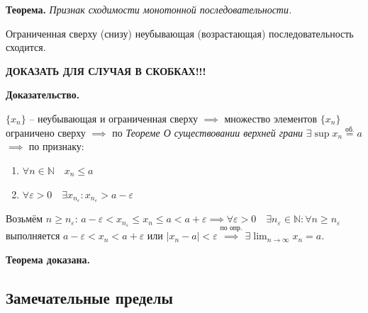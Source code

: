 \documentclass[a4paper,oneside]{article}
\newcommand{\bydef}{\stackrel{\text{по опр.}}{\implies}} %
\newcommand{\parspace}{\vspace{10pt}}
\newcommand{\dslim}{\displaystyle\lim}
\newcommand{\dslimn}{\dslim_{n \to \infty}}
\begin{document}
\parspace

\textbf{Теорема.} \textit{Признак сходимости монотонной последовательности.}

Ограниченная сверху (снизу) неубывающая (возрастающая) последовательность сходится.

\textbf{ДОКАЗАТЬ ДЛЯ СЛУЧАЯ В СКОБКАХ!!!}

\textbf{Доказательство.}

$\{x_n\}$ -- неубывающая и ограниченная сверху $\implies$ множество элементов
$\{x_n\}$ ограничено сверху $\implies$ по
\textit{Теореме О существовании верхней грани} 
$\exists \sup x_n \stackrel{\text{об.}}{=} a$ $\implies$ по признаку:
\begin{enumerate}
    \item $\forall n \in \mathbb{N} \quad x_n \le a$
    \item $\forall \varepsilon > 0 \quad 
    \exists x_{n_\varepsilon} : x_{n_\varepsilon} > a - \varepsilon$
\end{enumerate}

Возьмём $n \ge n_\varepsilon$: 
$a - \varepsilon < x_{n_\varepsilon} \le x_n \le a < a + \varepsilon
\implies \forall \varepsilon > 0 \quad \exists n_\varepsilon \in \mathbb{N}:
\forall n \ge n_\varepsilon$ выполняется $a - \varepsilon < x_n < a + \varepsilon$
или $|x_n - a| < \varepsilon \bydef \exists \dslimn x_n = a$.

\textbf{Теорема доказана.}

\subsection{Замечательные пределы}
\end{document}
